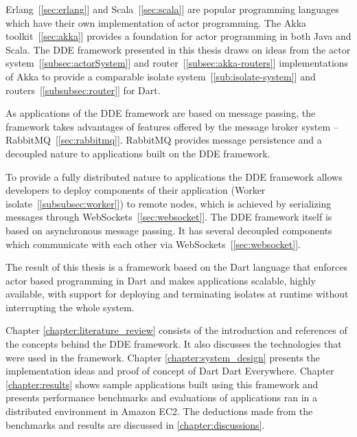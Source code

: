  Erlang~[\autoref{sec:erlang}] and Scala~[\autoref{sec:scala}] are popular programming languages which have their own implementation of actor programming. The Akka toolkit~[\autoref{sec:akka}] provides a foundation for actor programming in both Java and Scala. The DDE framework presented in this thesis draws on ideas from the actor system~[\autoref{subsec:actorSystem}] and router~[\autoref{subsec:akka-routers}]
   implementations of Akka to provide a comparable isolate system~[\autoref{sub:isolate-system}] and routers~[\autoref{subsubsec:router}] for Dart.

  As applications of the DDE framework are based on message passing, the framework takes advantages of features offered by the message broker system – RabbitMQ~[\autoref{sec:rabbitmq}]. RabbitMQ provides message persistence and a decoupled nature to applications built on the DDE framework.

  To provide a fully distributed nature to applications the DDE framework allows developers to deploy components of their application (Worker isolate~[\autoref{subsubsec:worker}]) to remote nodes, which is achieved by serializing messages through WebSockets~[\autoref{sec:websocket}]. The DDE framework itself is based on asynchronous message passing. It has several decoupled components which communicate with each other via WebSockets~[\autoref{sec:websocket}].

  The result of this thesis is a framework based on the Dart language that enforces actor based programming in Dart and makes applications scalable, highly available, with support for deploying and terminating isolates at runtime without interrupting the whole system.

 Chapter \ref{chapter:literature_review} consists of the introduction and references of the concepts behind the DDE framework. It also discusses the technologies that were used in the framework. Chapter \ref{chapter:system_design} presents the implementation ideas and proof of concept of Dart Dart Everywhere. Chapter \ref{chapter:results} shows sample applications built using this framework and presents performance benchmarks and evaluations of applications ran in a distributed environment in Amazon EC2. The deductions made from the benchmarks and results are discussed in \autoref{chapter:discussions}.

